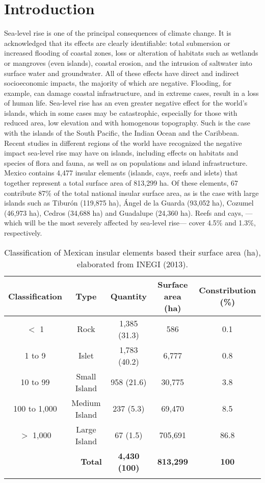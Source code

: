\documentclass{article} %
\begin{document}
\section{Introduction}

Sea-level rise is one of the principal consequences of climate change. It is
acknowledged that its effects are clearly identifiable: total submersion or increased
flooding of coastal zones, loss or alteration of habitats such as wetlands or mangroves
(even islands), coastal erosion, and the intrusion of saltwater into surface water and
groundwater. All of these effects have direct and indirect socioeconomic impacts, the
majority of which are negative. Flooding, for example, can damage coastal
infrastructure, and in extreme cases, result in a loss of human life. Sea-level rise has
an even greater negative effect for the world’s islands, which in some cases may be
catastrophic, especially for those with reduced area, low elevation and with
homogenous topography. Such is the case with the islands of the South Pacific, the
Indian Ocean and the Caribbean. Recent studies in different regions of the world have
recognized the negative impact sea-level rise may have on islands, including effects
on habitats and species of flora and fauna, as well as on populations and island
infrastructure. Mexico contains 4,477 insular elements (islands, cays, reefs and islets)
that together represent a total surface area of 813,299 ha. Of these elements, 67
contribute 87\% of the total national insular surface area, as is the case with large
islands such as Tiburón (119,875 ha), Ángel de la Guarda (93,052 ha), Cozumel
(46,973 ha), Cedros (34,688 ha) and Guadalupe (24,360 ha). Reefs and cays, —
which will be the most severely affected by sea-level rise— cover 4.5\% and 1.3\%,
respectively.\\


\begin{table}
\caption{Classification of Mexican insular elements based their surface area (ha), elaborated from INEGI (2013).}
\vspace{2mm}
\begin{tabular}{ccccc}
\hline 
\textbf{Classification} & \textbf{Type} & \textbf{Quantity} & \textbf{Surface area (ha)} & \textbf{Constribution (\%)} \\ 
\hline 
$<$ 1 & Rock & 1,385 (31.3) & 586 & 0.1 \\ 

1 to 9 & Islet & 1,783 (40.2) & 6,777 & 0.8 \\ 
 
10 to 99 & Small Island & 958 (21.6) & 30,775 & 3.8 \\ 

100 to 1,000 & Medium Island & 237 (5.3) & 69,470 & 8.5 \\ 

$>$ 1,000 & Large Island & 67 (1.5) & 705,691 & 86.8 \\ 
\hline 
\multicolumn{2}{r}{\textbf{Total}} & \textbf{4,430 (100)} & \textbf{813,299} & \textbf{100} \\ 
\hline
\label{Tab:tab1} 
\end{tabular} 
\end{table}
\end{document}
